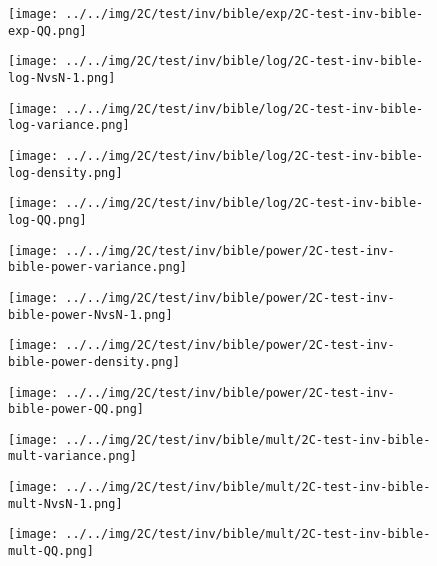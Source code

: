 \begin{figure}[H]
\centering	\texttt{[image: ../../img/2C/test/inv/bible/exp/2C-test-inv-bible-exp-QQ.png]}
\end{figure}
\begin{figure}[H]
\centering	\texttt{[image: ../../img/2C/test/inv/bible/log/2C-test-inv-bible-log-NvsN-1.png]}
\end{figure}
\begin{figure}[H]
\centering	\texttt{[image: ../../img/2C/test/inv/bible/log/2C-test-inv-bible-log-variance.png]}
\end{figure}
\begin{figure}[H]
\centering	\texttt{[image: ../../img/2C/test/inv/bible/log/2C-test-inv-bible-log-density.png]}
\end{figure}
\begin{figure}[H]
\centering	\texttt{[image: ../../img/2C/test/inv/bible/log/2C-test-inv-bible-log-QQ.png]}
\end{figure}
\begin{figure}[H]
\centering	\texttt{[image: ../../img/2C/test/inv/bible/power/2C-test-inv-bible-power-variance.png]}
\end{figure}
\begin{figure}[H]
\centering	\texttt{[image: ../../img/2C/test/inv/bible/power/2C-test-inv-bible-power-NvsN-1.png]}
\end{figure}
\begin{figure}[H]
\centering	\texttt{[image: ../../img/2C/test/inv/bible/power/2C-test-inv-bible-power-density.png]}
\end{figure}
\begin{figure}[H]
\centering	\texttt{[image: ../../img/2C/test/inv/bible/power/2C-test-inv-bible-power-QQ.png]}
\end{figure}
\begin{figure}[H]
\centering	\texttt{[image: ../../img/2C/test/inv/bible/mult/2C-test-inv-bible-mult-variance.png]}
\end{figure}
\begin{figure}[H]
\centering	\texttt{[image: ../../img/2C/test/inv/bible/mult/2C-test-inv-bible-mult-NvsN-1.png]}
\end{figure}
\begin{figure}[H]
\centering	\texttt{[image: ../../img/2C/test/inv/bible/mult/2C-test-inv-bible-mult-QQ.png]}
\end{figure}
